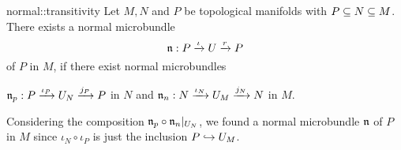 \begin{mylemma}{normal::transitivity}
    Let $M, N$ and $P$ be topological manifolds with $P \sub N \sub M$.
    There exists a normal microbundle
    \[ \bundledef{\bn}{P}{U}{\iota}{r} \]
    of $P$ in $M$, if there exist normal microbundles
    \begin{center}
        $\bundledef{\bn_p}{P}{U_N}{\iota_P}{j_P}$ in $N$ and $\bundledef{\bn_n}{N}{U_M}{\iota_N}{j_N}$ in $M$.
    \end{center}
\end{mylemma}

\begin{myproof}
    Considering the composition $\bn_p \circ \bn_n\restr{U_N}$, we found a normal microbundle $\bn$ of $P$ in $M$
    since $\iota_N \circ \iota_P$ is just the inclusion $P \incl U_M$.
\end{myproof}